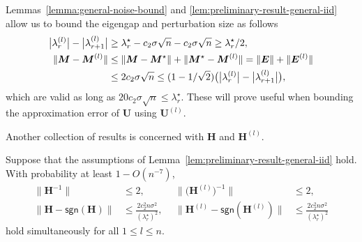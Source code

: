 \begin{remark}\label{remark:perturbation-size-eigen-gap}
Lemmas~\ref{lemma:general-noise-bound} and \ref{lem:preliminary-result-general-iid} allow us to bound the eigengap and perturbation size as follows
%
\begin{subequations}\label{eq:lambda-rl-lambda-r1l-M-Ml-LB-step}
\begin{align}
	\big| \lambda_{r}^{(l)} \big| - \big|\lambda_{r+1}^{(l)}\big|
	& \geq \lambda_{r}^{\star}-  c_2 \sigma \sqrt{n} - c_2 \sigma \sqrt{n}
	\geq \lambda_{r}^{\star}/2,
	\label{eq:lambda-rl-lambda-r1l-LB-step}  \\
	\|\bm{M}-\bm{M}^{(l)}\| & \leq\|\bm{M}-\bm{M}^{\star}\|+\|\bm{M}^{\star}-\bm{M}^{(l)}\|=\|\bm{E}\|+\|\bm{E}^{(l)}\|  \notag\\
	& \leq2c_{2}\sigma\sqrt{n}\leq(1-1/\sqrt{2}) \big( \big| \lambda_{r}^{(l)} \big| - \big|\lambda_{r+1}^{(l)}\big| \big),
	\label{eq:M-Ml-size-step}
\end{align}
%
\end{subequations}
%
which are valid as long as $20 c_2 \sigma \sqrt{n} \leq \lambda_r^{\star}$. These will prove useful when bounding the approximation error of $\bm{U}$ using $\bm{U}^{(l)}$.
\end{remark}

Another collection of results is concerned with $\bm{H}$ and $\bm{H}^{(l)}$.
%
\begin{lemma} \label{lem:H-property-summary-general} Suppose that the
assumptions of Lemma~\ref{lem:preliminary-result-general-iid} hold. With
probability at least $1-O(n^{-7})$, \begin{subequations}
\label{eq:H-property-summary-general}
\begin{align}
\|\bm{H}^{-1}\| & \leq2,\quad & \big\|\big(\bm{H}^{(l)}\big)^{-1}\big\| & \leq2,\label{eq:H-inv-norm-bound-general}\\
\big\|\bm{H}-\mathsf{sgn}(\bm{H})\big\| & \leq\frac{2c_{2}^{2}n\sigma^{2}}{(\lambda_{r}^{\star})^{2}},~~ & \big\|\bm{H}^{(l)}-\mathsf{sgn}(\bm{H}^{(l)})\big\| & \leq\frac{2c_{2}^{2}n\sigma^{2}}{(\lambda_{r}^{\star})^{2}}\label{eq:H-sgnH-dist-general}
\end{align}
\end{subequations} hold simultaneously for all $1\leq l\leq n$.

\end{lemma}


